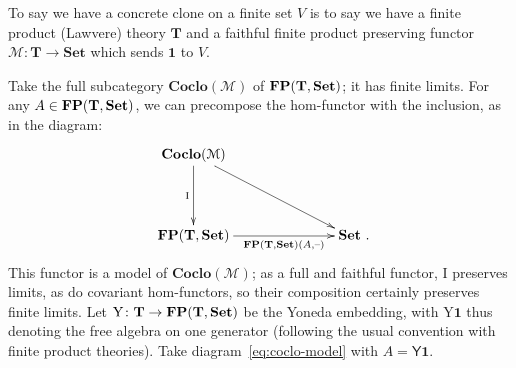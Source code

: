 \documentclass[11pt, a4paper, twoside,leqno]{amsart}
\newcommand{\cat}[1]{\mathbf{#1}}
\newcommand{\thg}{{\mathord{\text{--}}}}
\newcommand{\defeq}{\mathrel{\mathop:}=}
\newcommand{\cd}[2][]{\vcenter{\hbox{\xymatrix#1{#2}}}}
\numberwithin{equation}{section}
\theoremstyle{plain}
\theoremstyle{definition}
\newcommand{\Set}{\cat{Set}}
\newcommand{\aone}{{\mathbf 1}}
\DeclareMathOperator{\FP}{\bf FP}
\begin{document}
To say we have a concrete clone on a finite set \(V\) is to say we
have a finite
product (Lawvere) theory \(\cat{T}\) and a
faithful finite product preserving functor \(\mathcal{M} \colon
\cat{T} \rightarrow \Set\) which sends \(\aone\) to \(V\).

Take
the full subcategory
\( \cat{Coclo}(\mathcal{M})\)
of \(\FP(\cat{T},
\cat{Set})\); it has finite limits. For any \(A \in
\FP(\cat{T},\Set)\), we can precompose
the hom-functor with the inclusion, as in the diagram:
\begin{equation}
  \label{eq:coclo-model}
  \xymatrixcolsep{6pc}
  \xymatrixrowsep{3.5pc}
  \cd{
    {\cat{Coclo}(\mathcal{M})} \ar[d]_-{\mathrm{I}
    } \ar[dr]
    & \\
    {\FP(\cat{T},\Set)} \ar[r]_-{\FP(\cat{T},\Set)(
      A,\thg)
    } & {\Set}
    \rlap{ .}
  }
\end{equation}
This functor is a model of \(\cat{Coclo}(\mathcal{M})\); as a full and faithful functor, \(\mathrm{I}
\) preserves limits, as do covariant
hom-functors, so their composition certainly preserves finite limits.
Let \(\mathrm{Y}
\colon \cat{T} \rightarrow \FP(\cat{T},\Set)\) be the Yoneda
embedding, with \(\mathrm{Y}\aone\) thus denoting the free algebra on
one generator (following the usual convention with finite product
theories). Take diagram~\eqref{eq:coclo-model} with \(A =
\mathsf{Y}\aone\).
\end{document}
